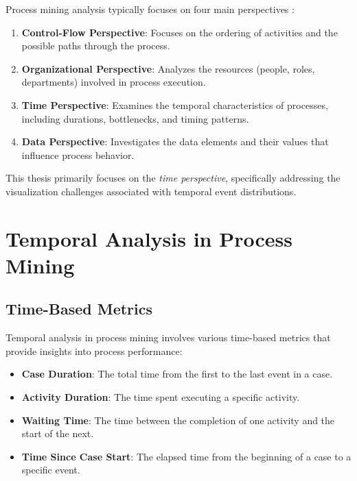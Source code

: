 Process mining analysis typically focuses on four main perspectives \cite{vanderaalst2016process}:

\begin{enumerate}
    \item \textbf{Control-Flow Perspective}: Focuses on the ordering of activities and the possible paths through the process.
    
    \item \textbf{Organizational Perspective}: Analyzes the resources (people, roles, departments) involved in process execution.
    
    \item \textbf{Time Perspective}: Examines the temporal characteristics of processes, including durations, bottlenecks, and timing patterns.
    
    \item \textbf{Data Perspective}: Investigates the data elements and their values that influence process behavior.
\end{enumerate}

This thesis primarily focuses on the \textit{time perspective}, specifically addressing the visualization challenges associated with temporal event distributions.

\section{Temporal Analysis in Process Mining}
\label{sec:temporal_analysis}

\subsection{Time-Based Metrics}
\label{subsec:time_metrics}

Temporal analysis in process mining involves various time-based metrics that provide insights into process performance:

\begin{itemize}
    \item \textbf{Case Duration}: The total time from the first to the last event in a case.
    \item \textbf{Activity Duration}: The time spent executing a specific activity.
    \item \textbf{Waiting Time}: The time between the completion of one activity and the start of the next.
    \item \textbf{Time Since Case Start}: The elapsed time from the beginning of a case to a specific event.
\end{itemize}


